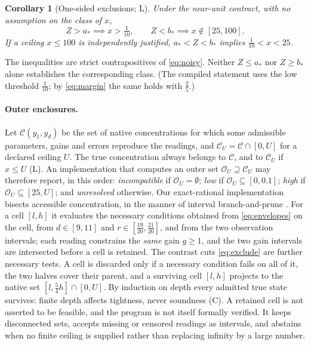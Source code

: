 \documentclass[11pt]{article}
\theoremstyle{plain}
\newtheorem{corollary}[theorem]{Corollary}
\theoremstyle{definition}
\numberwithin{equation}{section}
\newcommand{\compatible}{\mathcal C}
\newcommand{\outerset}{\mathcal O}
\newcommand{\Lean}{\textsf{L}}   %
\newcommand{\Conv}{\textsf{C}}   %
\begin{document}
\begin{corollary}[One-sided exclusions; \Lean]\label{cor:unpromised}
Under the near-unit contract, with no assumption on the class of $x$,
\begin{equation}\label{eq:exclude}
 Z>a_*\implies x>\tfrac1{10},\qquad Z<b_*\implies x\notin[25,100].
\end{equation}
If a ceiling $x\le100$ is independently justified, $a_*<Z<b_*$ implies
$\frac1{10}<x<25$.
\end{corollary}
The inequalities are strict contrapositives of \eqref{eq:noisy}. Neither
$Z\le a_*$ nor $Z\ge b_*$ alone establishes the corresponding class. (The compiled
statement uses the low threshold $\frac1{10}$; by \eqref{eq:margin} the same holds with
$\frac25$.)

\paragraph{Outer enclosures.} Let $\compatible(y_1,y_d)$ be the set of native
concentrations for which some admissible parameters, gains and errors reproduce the
readings, and $\compatible_U=\compatible\cap[0,U]$ for a declared ceiling $U$. The
true concentration always belongs to $\compatible$, and to $\compatible_U$ if
$x\le U$ (\Lean). An implementation that computes an outer set
$\outerset_U\supseteq\compatible_U$ may therefore report, in this order:
\emph{incompatible} if $\outerset_U=\emptyset$; \emph{low} if
$\outerset_U\subseteq[0,0.1]$; \emph{high} if $\outerset_U\subseteq[25,U]$; and
\emph{unresolved} otherwise. Our exact-rational implementation bisects accessible
concentration, in the manner of interval branch-and-prune \cite{moore2009}. For a
cell $[l,h]$ it evaluates the necessary conditions obtained from
\eqref{eq:envelopes} on the cell, from $d\in[9,11]$ and $r\in[\frac{19}{20},\frac{21}{20}]$,
and from the two observation intervals; each reading constrains the \emph{same}
gain $g\ge1$, and the two gain intervals are intersected before a cell is retained.
The contrast cuts \eqref{eq:exclude} are further necessary tests. A cell is
discarded only if a necessary condition fails on all of it, the two halves cover
their parent, and a surviving cell $[l,h]$ projects to the native set
$[l,\frac54h]\cap[0,U]$. By induction on depth every admitted true state survives:
finite depth affects tightness, never soundness (\Conv). A retained cell is not
asserted to be feasible, and the program is not itself formally verified. It keeps
disconnected sets, accepts missing or censored readings as intervals, and abstains
when no finite ceiling is supplied rather than replacing infinity by a large number.
\end{document}
